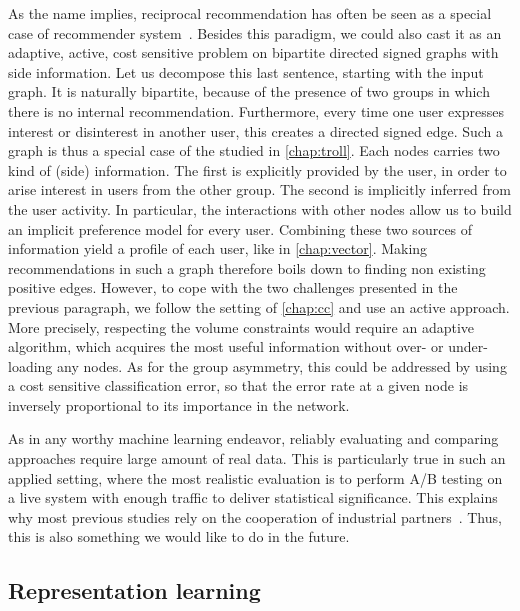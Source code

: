 As the name implies, reciprocal recommendation has often be seen as a special case of recommender
system~\autocite{Andrews2015}. Besides this paradigm, we could also cast it as an adaptive, active,
cost sensitive \esp{} problem on bipartite directed signed graphs with side information. Let us
decompose this last sentence, starting with the input graph. It is naturally bipartite, because of
the presence of two groups in which there is no internal recommendation. Furthermore, every time one
user expresses interest or disinterest in another user, this creates a directed signed edge. Such a
graph is thus a special case of the \dssn{} studied in \autoref{chap:troll}. Each nodes carries two
kind of (side) information. The first is explicitly provided by the user, in order to arise interest in
users from the other group. The second is implicitly inferred from the user activity. In particular,
the interactions with other nodes allow us to build an implicit preference model for every user.
Combining these two sources of information yield a profile of each user, like in
\autoref{chap:vector}. Making recommendations in such a graph therefore boils down to finding non
existing positive edges. However, to cope with the two challenges presented in the previous
paragraph, we follow the setting of \autoref{chap:cc} and use an active approach. More precisely,
respecting the volume constraints would require an adaptive algorithm, which acquires the most
useful information without over- or under-loading any nodes. As for the group asymmetry, this could
be addressed by using a cost sensitive classification error, so that the error rate at a given node
is inversely proportional to its importance in the network.

As in any worthy machine learning endeavor, reliably evaluating and comparing approaches require
large amount of real data. This is particularly true in such an applied setting, where the most
realistic evaluation is to perform A/B testing on a live system with enough traffic to deliver
statistical significance. This explains why most previous studies rely on the cooperation of
industrial partners~\autocites{Andrews2015}{Kille2015}{Krzywicki2015}{Xia2015}{Alanazi}. Thus, this
is also something we would like to do in the future.

\subsection{Representation learning}
\label{par:representation_learning}

